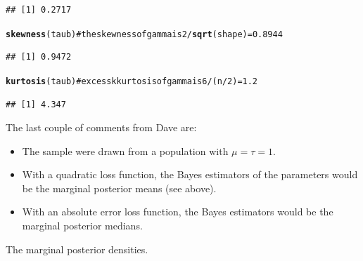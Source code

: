 \documentclass[12pt, a4paper, oneside]{article}\usepackage{graphicx, color}
\makeatletter
\newcommand{\hlfunctioncall}[1]{\textcolor[rgb]{0.501960784313725,0,0.329411764705882}{\textbf{#1}}}%
\newcommand{\hlcomment}[1]{\textcolor[rgb]{0.180392156862745,0.6,0.341176470588235}{#1}}%
\newenvironment{kframe}{%
 \def\at@end@of@kframe{}%
 \ifinner\ifhmode%
  \def\at@end@of@kframe{\end{minipage}}%
  \begin{minipage}{\columnwidth}%
 \fi\fi%
 \def\FrameCommand##1{\hskip\@totalleftmargin \hskip-\fboxsep
 \colorbox{shadecolor}{##1}\hskip-\fboxsep
     \hskip-\linewidth \hskip-\@totalleftmargin \hskip\columnwidth}%
 \MakeFramed {\advance\hsize-\width
   \@totalleftmargin\z@ \linewidth\hsize
   \@setminipage}}%
 {\par\unskip\endMakeFramed%
 \at@end@of@kframe}
\newenvironment{knitrout}{}{} %
\makeatother
\begin{document}
\begin{knitrout}
\begin{kframe}
\begin{verbatim}
## [1] 0.2717
\end{verbatim}
\begin{alltt}
\hlfunctioncall{skewness}(taub)  \hlcomment{# the skewness of gamma is 2/\hlfunctioncall{sqrt}(shape) = 0.8944}
\end{alltt}
\begin{verbatim}
## [1] 0.9472
\end{verbatim}
\begin{alltt}
\hlfunctioncall{kurtosis}(taub)  \hlcomment{# excess kkurtosis of gamma is 6/(n/2) = 1.2}
\end{alltt}
\begin{verbatim}
## [1] 4.347
\end{verbatim}
\end{kframe}
\end{knitrout}


The last couple of comments from Dave are:
\begin{itemize}
\item The sample were drawn from a population with $\mu = \tau = 1$.  
\item With a quadratic loss function, the Bayes estimators of the parameters would be the marginal posterior means (see above). 
\item With an absolute error loss function, the Bayes estimators would be the marginal posterior medians. 
\end{itemize}
The marginal posterior densities. 
\end{document}
